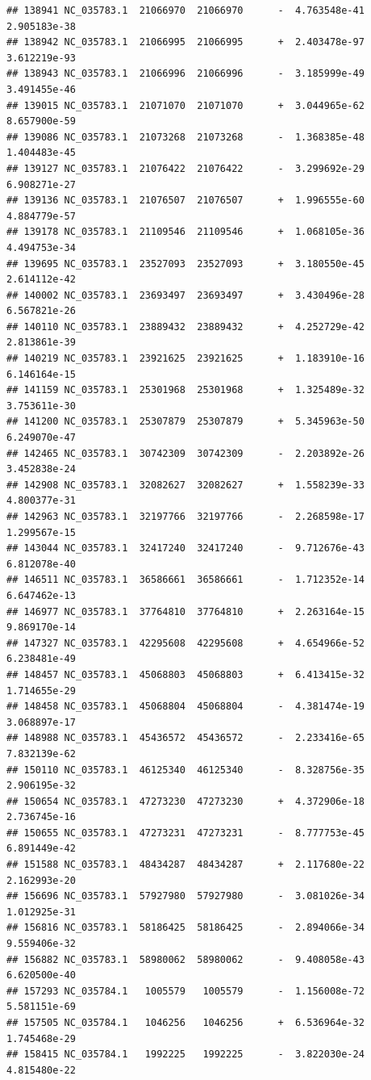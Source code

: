 \documentclass[]{article}
\begin{document}
\begin{verbatim}
## 138941 NC_035783.1  21066970  21066970      -  4.763548e-41  2.905183e-38
## 138942 NC_035783.1  21066995  21066995      +  2.403478e-97  3.612219e-93
## 138943 NC_035783.1  21066996  21066996      -  3.185999e-49  3.491455e-46
## 139015 NC_035783.1  21071070  21071070      +  3.044965e-62  8.657900e-59
## 139086 NC_035783.1  21073268  21073268      -  1.368385e-48  1.404483e-45
## 139127 NC_035783.1  21076422  21076422      -  3.299692e-29  6.908271e-27
## 139136 NC_035783.1  21076507  21076507      +  1.996555e-60  4.884779e-57
## 139178 NC_035783.1  21109546  21109546      +  1.068105e-36  4.494753e-34
## 139695 NC_035783.1  23527093  23527093      +  3.180550e-45  2.614112e-42
## 140002 NC_035783.1  23693497  23693497      +  3.430496e-28  6.567821e-26
## 140110 NC_035783.1  23889432  23889432      +  4.252729e-42  2.813861e-39
## 140219 NC_035783.1  23921625  23921625      +  1.183910e-16  6.146164e-15
## 141159 NC_035783.1  25301968  25301968      +  1.325489e-32  3.753611e-30
## 141200 NC_035783.1  25307879  25307879      +  5.345963e-50  6.249070e-47
## 142465 NC_035783.1  30742309  30742309      -  2.203892e-26  3.452838e-24
## 142908 NC_035783.1  32082627  32082627      +  1.558239e-33  4.800377e-31
## 142963 NC_035783.1  32197766  32197766      -  2.268598e-17  1.299567e-15
## 143044 NC_035783.1  32417240  32417240      -  9.712676e-43  6.812078e-40
## 146511 NC_035783.1  36586661  36586661      -  1.712352e-14  6.647462e-13
## 146977 NC_035783.1  37764810  37764810      +  2.263164e-15  9.869170e-14
## 147327 NC_035783.1  42295608  42295608      +  4.654966e-52  6.238481e-49
## 148457 NC_035783.1  45068803  45068803      +  6.413415e-32  1.714655e-29
## 148458 NC_035783.1  45068804  45068804      -  4.381474e-19  3.068897e-17
## 148988 NC_035783.1  45436572  45436572      -  2.233416e-65  7.832139e-62
## 150110 NC_035783.1  46125340  46125340      -  8.328756e-35  2.906195e-32
## 150654 NC_035783.1  47273230  47273230      +  4.372906e-18  2.736745e-16
## 150655 NC_035783.1  47273231  47273231      -  8.777753e-45  6.891449e-42
## 151588 NC_035783.1  48434287  48434287      +  2.117680e-22  2.162993e-20
## 156696 NC_035783.1  57927980  57927980      -  3.081026e-34  1.012925e-31
## 156816 NC_035783.1  58186425  58186425      -  2.894066e-34  9.559406e-32
## 156882 NC_035783.1  58980062  58980062      -  9.408058e-43  6.620500e-40
## 157293 NC_035784.1   1005579   1005579      -  1.156008e-72  5.581151e-69
## 157505 NC_035784.1   1046256   1046256      +  6.536964e-32  1.745468e-29
## 158415 NC_035784.1   1992225   1992225      -  3.822030e-24  4.815480e-22

\end{verbatim}
\end{document}
